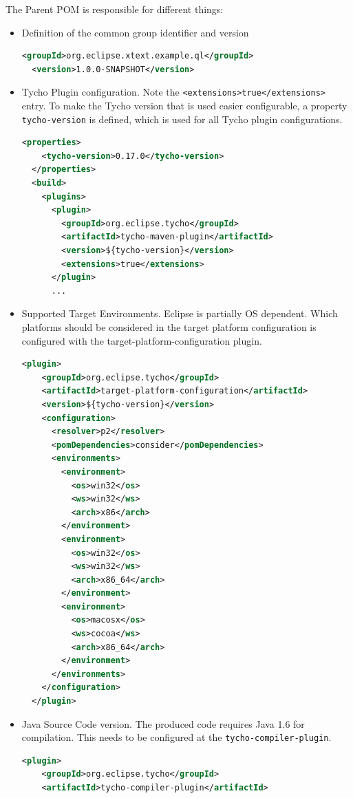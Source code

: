 The Parent POM is responsible for different things:
\begin{itemize}
\item Definition of the common group identifier and version
\begin{lstlisting}[language=XML]
  <groupId>org.eclipse.xtext.example.ql</groupId>
  <version>1.0.0-SNAPSHOT</version>
\end{lstlisting}
\item Tycho Plugin configuration. Note the
\texttt{<extensions>true</extensions>} entry. To make the Tycho version that is
used easier configurable, a property \texttt{tycho-version} is defined, which is used for
all Tycho plugin configurations.
\begin{lstlisting}[language=XML]
  <properties>
    <tycho-version>0.17.0</tycho-version>
  </properties>
  <build>
    <plugins>
      <plugin>
        <groupId>org.eclipse.tycho</groupId>
        <artifactId>tycho-maven-plugin</artifactId>
        <version>${tycho-version}</version>
        <extensions>true</extensions>
      </plugin>
      ...
\end{lstlisting}
\item Supported Target Environments. Eclipse is partially OS dependent. Which
platforms should be considered in the target platform configuration is
configured with the target-platform-configuration plugin.
\begin{lstlisting}[language=XML]
  <plugin>
    <groupId>org.eclipse.tycho</groupId>
    <artifactId>target-platform-configuration</artifactId>
    <version>${tycho-version}</version>
    <configuration>
      <resolver>p2</resolver>
      <pomDependencies>consider</pomDependencies>
      <environments>
        <environment>
          <os>win32</os>
          <ws>win32</ws>
          <arch>x86</arch>
        </environment>
        <environment>
          <os>win32</os>
          <ws>win32</ws>
          <arch>x86_64</arch>
        </environment>
        <environment>
          <os>macosx</os>
          <ws>cocoa</ws>
          <arch>x86_64</arch>
        </environment>
      </environments>
    </configuration>
  </plugin>
\end{lstlisting}
\item Java Source Code version. The produced code requires Java 1.6 for
compilation. This needs to be configured at the \texttt{tycho-compiler-plugin}.
\begin{lstlisting}[language=XML]
  <plugin>
    <groupId>org.eclipse.tycho</groupId>
    <artifactId>tycho-compiler-plugin</artifactId>

\end{lstlisting}
\end{itemize}
